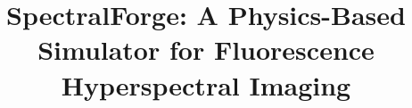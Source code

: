 \documentclass{article}
\begin{document}
\ninept

\title{SpectralForge: A Physics-Based Simulator for Fluorescence Hyperspectral Imaging}

\address{$^{1}$Akian College of Science and Engineering, American University of Armenia, Yerevan, Armenia \\
$^{2}$Engineering Research Center, American University of Armenia, Yerevan, Armenia \\
$^{3}$L.A.\ Orbeli Institute of Physiology NAS RA, Yerevan, Armenia \\
$^{4}$George Washington University, Washington, DC, USA \\
\texttt{narek.h.meloyan@gmail.com}, \texttt{phynas@gwu.edu}}

\maketitle
\end{document}

